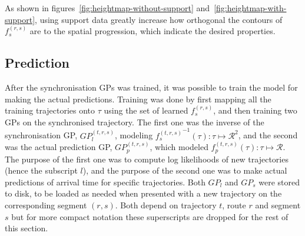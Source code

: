 \noindent
As shown in figures~\ref{fig:heightmap-without-support} and~\ref{fig:heightmap-with-support}, using support data greatly increase how orthogonal the contours of $f^{(r,s)}_s$ are to the spatial progression, which indicate the desired properties.

\subsection{Prediction}
After the synchronisation GPs was trained, it was possible to train
the model for making the actual predictions. Training was done by
first mapping all the training trajectories onto $\tau$ using the set
of learned  $f^{(r,s)}_s$, and then training two GPs on the
synchronised trajectory. The first one was the inverse of the
synchronisation GP, ${GP_l^{(t, r,s)}}$, modeling
${f^{(t,r,s)}_s}^{-1}(\tau) : \tau \mapsto \mathcal{R}^2$,
and the second
was the actual prediction GP, $GP_p^{(t,r,s)}$, which modeled
${f^{(t,r,s)}_p}(\tau) : \tau \mapsto \mathcal{R}$. The purpose
of the first one was to compute log likelihoods of new trajectories
(hence the subscript $l$), and
the purpose of the second one was to make actual predictions of
arrival time for specific trajectories. Both $GP_l$ and $GP_s$ were stored to
disk, to be loaded as needed when presented with a new trajectory on
the corresponding segment $(r, s)$. Both depend on trajectory
$t$, route $r$ and segment $s$ but for more compact notation these
superscripts are dropped for the rest of this section.

